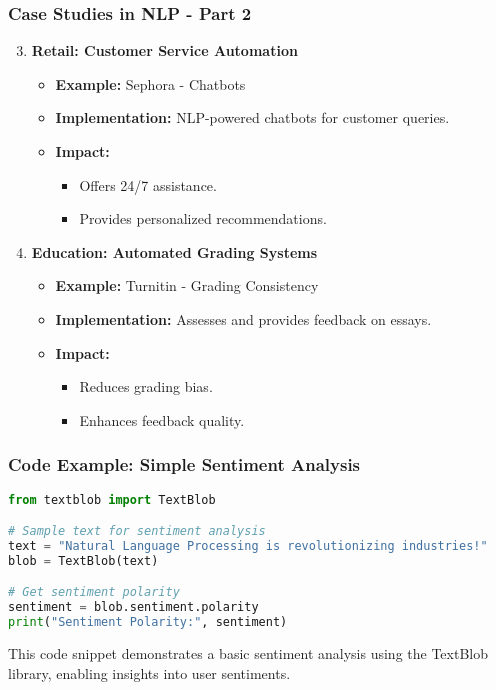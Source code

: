 \documentclass[aspectratio=169]{beamer}
\begin{document}
\begin{frame}
    \frametitle{Case Studies in NLP - Part 2}
    \begin{enumerate}
        \setcounter{enumi}{2}
        \item \textbf{Retail: Customer Service Automation}
        \begin{itemize}
            \item \textbf{Example:} Sephora - Chatbots
            \item \textbf{Implementation:} NLP-powered chatbots for customer queries.
            \item \textbf{Impact:}
            \begin{itemize}
                \item Offers 24/7 assistance.
                \item Provides personalized recommendations.
            \end{itemize}
        \end{itemize}
        
        \item \textbf{Education: Automated Grading Systems}
        \begin{itemize}
            \item \textbf{Example:} Turnitin - Grading Consistency
            \item \textbf{Implementation:} Assesses and provides feedback on essays.
            \item \textbf{Impact:}
            \begin{itemize}
                \item Reduces grading bias.
                \item Enhances feedback quality.
            \end{itemize}
        \end{itemize}
    \end{enumerate}
\end{frame}

\begin{frame}[fragile]
    \frametitle{Code Example: Simple Sentiment Analysis}
    \begin{lstlisting}[language=Python]
from textblob import TextBlob

# Sample text for sentiment analysis
text = "Natural Language Processing is revolutionizing industries!"
blob = TextBlob(text)

# Get sentiment polarity
sentiment = blob.sentiment.polarity
print("Sentiment Polarity:", sentiment)
    \end{lstlisting}
    \begin{block}{}
        This code snippet demonstrates a basic sentiment analysis using the TextBlob library, enabling insights into user sentiments.
    \end{block}
\end{frame}
\end{document}

